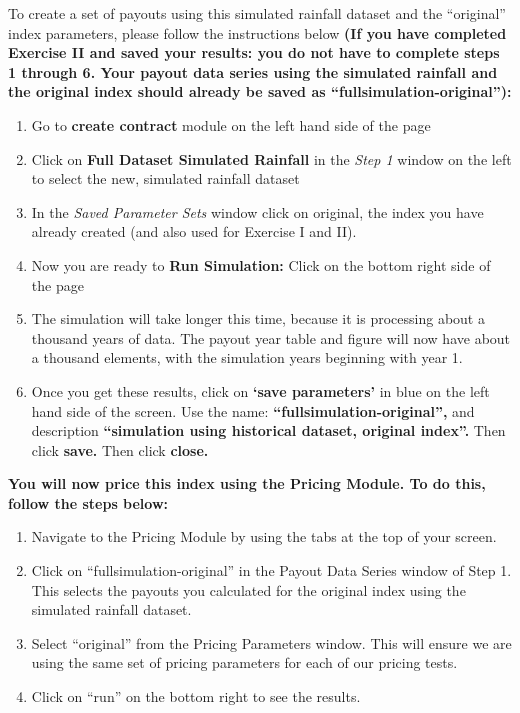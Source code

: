 \documentclass[letterpaper,10pt,english]{sphinxmanual}
\begin{document}
To create a set of payouts using this simulated rainfall dataset and the ``original'' index parameters, please follow the instructions below \textbf{(If you have completed Exercise II and saved your results: you do not have to complete steps 1 through 6. Your payout data series using the simulated rainfall and the original index should already be saved as ``fullsimulation-original''):}
\begin{enumerate}
\item {} 
Go to \textbf{create contract} module on the left hand side of the page

\item {} 
Click on \textbf{Full Dataset Simulated Rainfall} in the \emph{Step 1} window on the left to select the new, simulated rainfall dataset

\item {} 
In the \emph{Saved Parameter Sets} window click on original, the index you have already created (and also used for Exercise I and II).

\item {} 
Now you are ready to \textbf{Run Simulation:} Click on the bottom right side of the page

\item {} 
The simulation will take longer this time, because it is processing about a thousand years of data. The payout year table and figure will now have about a thousand elements, with the simulation years beginning with year 1.

\item {} 
Once you get these results, click on \textbf{`save parameters'} in blue on the left hand side of the screen.  Use the name: \textbf{``fullsimulation-original'',} and description \textbf{``simulation using historical dataset, original index''.} Then click \textbf{save.} Then click \textbf{close.}

\end{enumerate}

\textbf{You will now price this index using the Pricing Module. To do this, follow the steps below:}
\begin{enumerate}
\item {} 
Navigate to the Pricing Module by using the tabs at the top of your screen.

\item {} 
Click on ``fullsimulation-original'' in the Payout Data Series window of Step 1.  This selects the payouts you calculated for the original index using the simulated rainfall dataset.

\item {} 
Select ``original'' from the Pricing Parameters window.  This will ensure we are using the same set of pricing parameters for each of our pricing tests.

\item {} 
Click on ``run'' on the bottom right to see the results.

\end{enumerate}
\end{document}
